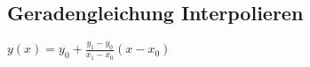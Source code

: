 


\begin{minipage}{13cm}
	
	
\end{minipage}
\begin{minipage}{5cm}
	
\end{minipage}
\begin{multicols}{2}
	
	\columnbreak
	
	
\end{multicols}
	
%	

\subsection{Geradengleichung Interpolieren}
$ y(x)=y_0 + \frac{y_1 - y_0}{x_1 - x_0}(x-x_0) $
\clearpage
